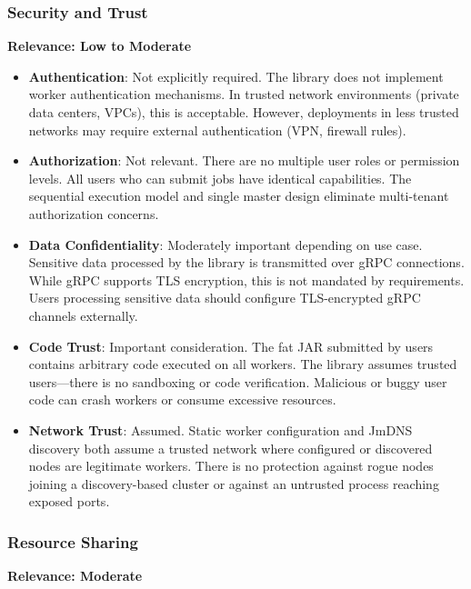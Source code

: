 \documentclass{scrartcl}
\begin{document}
\subsubsection{Security and Trust}

\textbf{Relevance: Low to Moderate}

\begin{itemize}
    \item \textbf{Authentication}: Not explicitly required. The library does not implement worker authentication mechanisms. In trusted network environments (private data centers, VPCs), this is acceptable. However, deployments in less trusted networks may require external authentication (VPN, firewall rules).

    \item \textbf{Authorization}: Not relevant. There are no multiple user roles or permission levels. All users who can submit jobs have identical capabilities. The sequential execution model and single master design eliminate multi-tenant authorization concerns.

    \item \textbf{Data Confidentiality}: Moderately important depending on use case. Sensitive data processed by the library is transmitted over gRPC connections. While gRPC supports TLS encryption, this is not mandated by requirements. Users processing sensitive data should configure TLS-encrypted gRPC channels externally.

    \item \textbf{Code Trust}: Important consideration. The fat JAR submitted by users contains arbitrary code executed on all workers. The library assumes trusted users—there is no sandboxing or code verification. Malicious or buggy user code can crash workers or consume excessive resources.

    \item \textbf{Network Trust}: Assumed. Static worker configuration and JmDNS discovery both assume a trusted network where configured or discovered nodes are legitimate workers. There is no protection against rogue nodes joining a discovery-based cluster or against an untrusted process reaching exposed ports.
\end{itemize}

\subsubsection{Resource Sharing}

\textbf{Relevance: Moderate}
\end{document}
